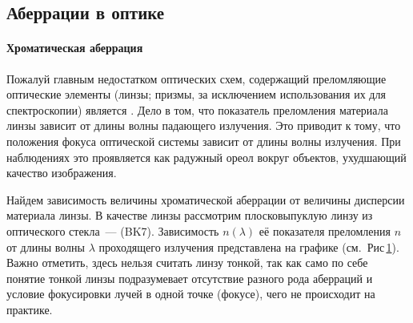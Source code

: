 \subsection{Аберрации в оптике}
\paragraph{Хроматическая аберрация}
Пожалуй главным недостатком оптических схем, содержащий преломляющие оптические элементы (линзы; призмы, за исключением использования их для спектроскопии) является . Дело в том, что показатель преломления материала линзы зависит от длины волны падающего излучения. Это приводит к тому, что положения фокуса оптической системы зависит от длины волны излучения. При наблюдениях это проявляется как радужный ореол вокруг объектов, ухудшающий качество изображения.

\begin{figure}
	\centering
	\vspace{-1pc}
	\caption{}
	\label{pic:crown-dispersion}
\end{figure}
Найдем зависимость величины хроматической аберрации от величины дисперсии материала линзы. В качестве линзы рассмотрим плосковыпуклую линзу из оптического стекла~---  (BK7). Зависимость $n(\lambda)$ её показателя преломления $n$ от длины волны $\lambda$ проходящего излучения представлена на графике (см.~Рис\,\ref{pic:crown-dispersion}). Важно отметить, здесь нельзя считать линзу тонкой, так как само по себе понятие тонкой линзы подразумевает отсутствие разного рода аберраций и условие фокусировки лучей в одной точке (фокусе), чего не происходит на практике.

